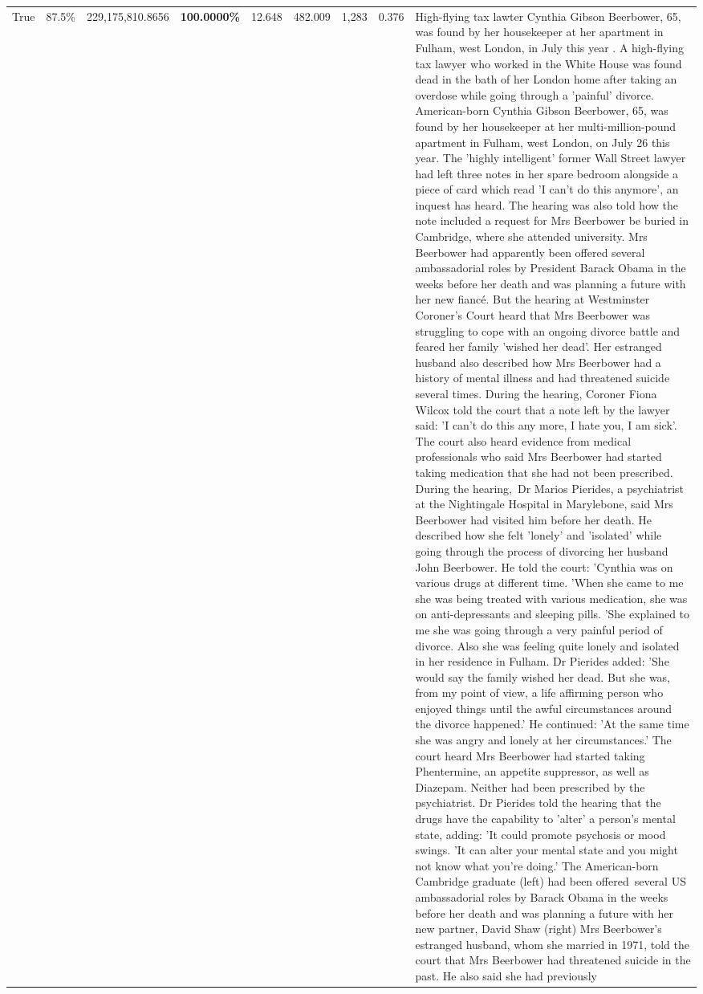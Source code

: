 \begin{table}[H]
\begin{tabular}{lllrlllll}
\cline{1-9}
True & 87.5\% & 229,175,810.8656 & \bfseries \color{red} 100.0000\% & 12.648 & 482.009 & 1,283 & 0.376 & High-flying tax lawter Cynthia Gibson Beerbower, 65, was found by her housekeeper at her apartment in Fulham, west London, in July this year . A high-flying tax lawyer who worked in the White House was found dead in the bath of her London home after taking an overdose while going through a 'painful' divorce. American-born Cynthia Gibson Beerbower, 65, was found by her housekeeper at her multi-million-pound apartment in Fulham, west London, on July 26 this year. The 'highly intelligent' former Wall Street lawyer had left three notes in her spare bedroom alongside a piece of card which read 'I can't do this anymore', an inquest has heard. The hearing was also told how the note included a request for Mrs Beerbower be buried in Cambridge, where she attended university. Mrs Beerbower had apparently been offered several ambassadorial roles by President Barack Obama in the weeks before her death and was planning a future with her new fiancé. But the hearing at Westminster Coroner's Court heard that Mrs Beerbower was struggling to cope with an ongoing divorce battle and feared her family 'wished her dead'. Her estranged husband also described how Mrs Beerbower had a history of mental illness and had threatened suicide several times. During the hearing, Coroner Fiona Wilcox told the court that a note left by the lawyer said: 'I can't do this any more, I hate you, I am sick'. The court also heard evidence from medical professionals who said Mrs Beerbower had started taking medication that she had not been prescribed. During the hearing, Dr Marios Pierides, a psychiatrist at the Nightingale Hospital in Marylebone, said Mrs Beerbower had visited him before her death. He described how she felt 'lonely' and 'isolated' while going through the process of divorcing her husband John Beerbower. He told the court: 'Cynthia was on various drugs at different time. 'When she came to me she was being treated with various medication, she was on anti-depressants and sleeping pills. 'She explained to me she was going through a very painful period of divorce. Also she was feeling quite lonely and isolated in her residence in Fulham. Dr Pierides added: 'She would say the family wished her dead. But she was, from my point of view, a life affirming person who enjoyed things until the awful circumstances around the divorce happened.' He continued: 'At the same time she was angry and lonely at her circumstances.' The court heard Mrs Beerbower had started taking Phentermine, an appetite suppressor, as well as Diazepam. Neither had been prescribed by the psychiatrist. Dr Pierides told the hearing that the drugs have the capability to 'alter' a person's mental state, adding: 'It could promote psychosis or mood swings. 'It can alter your mental state and you might not know what you're doing.' The American-born Cambridge graduate (left) had been offered several US ambassadorial roles by Barack Obama in the weeks before her death and was planning a future with her new partner, David Shaw (right) Mrs Beerbower's estranged husband, whom she married in 1971, told the court that Mrs Beerbower had threatened suicide in the past. He also said she had previously 
\end{tabular}
\end{table}
